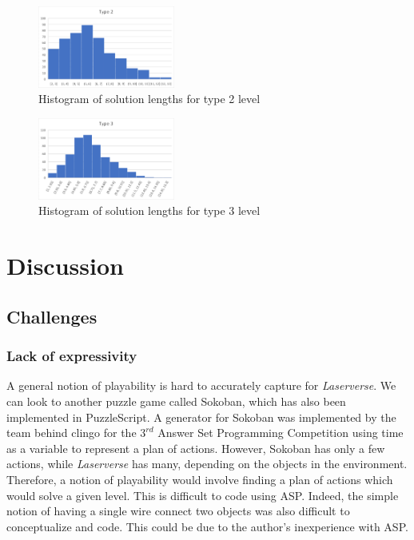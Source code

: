 \documentclass[letterpaper]{article}
\begin{document}
\begin{figure}[h]
    \centering
    \includegraphics[width=0.4\textwidth]{laser.png}
    \caption{Histogram of solution lengths for type 2 level}
    \label{fig:laser}
\end{figure}

\begin{figure}[h]
    \centering
    \includegraphics[width=0.4\textwidth]{mirror.png}
    \caption{Histogram of solution lengths for type 3 level}
    \label{fig:mirror}
\end{figure}

\section{Discussion}

\subsection{Challenges}

\subsubsection{Lack of expressivity}
A general notion of playability is hard to accurately capture for \textit{Laserverse}. We can look to another puzzle
game called Sokoban, which has also been implemented in PuzzleScript. A generator for Sokoban was implemented by the
team behind clingo for the $3^{rd}$ Answer Set Programming Competition \cite{aspcomp} using time as a variable to
represent a plan of actions. However, Sokoban has only a few actions, while \textit{Laserverse} has many, depending on
the objects in the environment. Therefore, a notion of playability would involve finding a plan of actions which would
solve a given level. This is difficult to code using ASP. Indeed, the simple notion of having a single wire connect two
objects was also difficult to conceptualize and code. This could be due to the author's inexperience with ASP.
\end{document}
